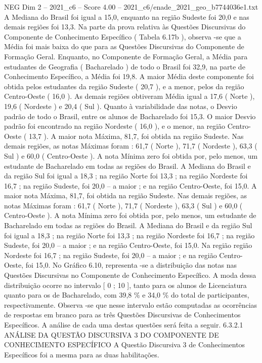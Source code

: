 \begin{textsample}{NEG Dim 2 – 2021\_c6 – Score 4.00 – 2021\_c6/enade\_2021\_geo\_b7744036e1.txt}
A Mediana do Brasil foi igual a 15,0, enquanto na região Sudeste foi 20,0 e nas demais regiões foi 13,3.
Na parte da prova relativa às Questões Discursivas do Componente de Conhecimento Específico ( Tabela 6.17b ), observa -se que a Média foi mais baixa do que para as Questões Discursivas do Componente de Formação Geral.
Enquanto, no Componente de Formação Geral, a Média para estudantes de Geografia ( Bacharelado ) de todo o Brasil foi 32,9, na parte de Conhecimento Específico, a Média foi 19,8.
A maior Média deste componente foi obtida pelos estudantes da região Sudeste ( 20,7 ), e a menor, pelos da região Centro-Oeste ( 16,0 ).
As demais regiões obtiveram Média igual a 17,6 ( Norte ), 19,6 ( Nordeste ) e 20,4 ( Sul ).
Quanto à variabilidade das notas, o Desvio padrão de todo o Brasil, entre os alunos de Bacharelado foi 15,3.
O maior Desvio padrão foi encontrado na região Nordeste ( 16,0 ), e o menor, na região Centro-Oeste ( 13,7 ).
A maior nota Máxima, 81,7, foi obtida na região Sudeste.
Nas demais regiões, as notas Máximas foram : 61,7 ( Norte ), 71,7 ( Nordeste ), 63,3 ( Sul ) e 60,0 ( Centro-Oeste ).
A nota Mínima zero foi obtida por, pelo menos, um estudante de Bacharelado em todas as regiões do Brasil.
A Mediana do Brasil e da região Sul foi igual a 18,3 ; na região Norte foi 13,3 ; na região Nordeste foi 16,7 ; na região Sudeste, foi 20,0 – a maior ; e na região Centro-Oeste, foi 15,0.
A maior nota Máxima, 81,7, foi obtida na região Sudeste.
Nas demais regiões, as notas Máximas foram : 61,7 ( Norte ), 71,7 ( Nordeste ), 63,3 ( Sul ) e 60,0 ( Centro-Oeste ).
A nota Mínima zero foi obtida por, pelo menos, um estudante de Bacharelado em todas as regiões do Brasil.
A Mediana do Brasil e da região Sul foi igual a 18,3 ; na região Norte foi 13,3 ; na região Nordeste foi 16,7 ; na região Sudeste, foi 20,0 – a maior ; e na região Centro-Oeste, foi 15,0.
Na região região Nordeste foi 16,7 ; na região Sudeste, foi 20,0 – a maior ; e na região Centro-Oeste, foi 15,0.
No Gráfico 6.10, representa -se a distribuição das notas nas Questões Discursivas no Componente de Conhecimento Específico.
A moda dessa distribuição ocorre no intervalo [ 0 ; 10 ], tanto para os alunos de Licenciatura quanto para os de Bacharelado, com 39,8 \% e 34,0 \% do total de participantes, respectivamente.
Observa -se que nesse intervalo estão computadas as ocorrências de respostas em branco para as três Questões Discursivas de Conhecimentos Específicos.
A análise de cada uma destas questões será feita a seguir. 6.3.2.1 ANÁLISE DA QUESTÃO DISCURSIVA 3 DO COMPONENTE DE CONHECIMENTO ESPECÍFICO A Questão Discursiva 3 de Conhecimentos Específicos foi a mesma para as duas habilitações.

\end{textsample}
